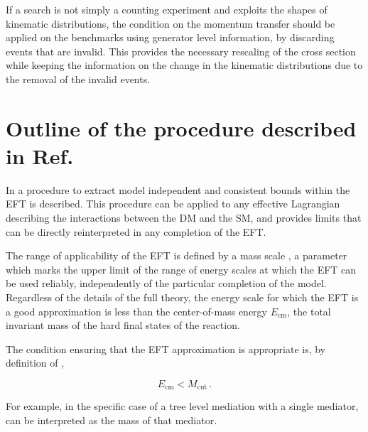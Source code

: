 If a search is not simply a counting experiment and exploits the shapes of kinematic distributions, the condition on the momentum transfer should be applied on the benchmarks using generator level information, by discarding events that are invalid. This provides the necessary rescaling of the cross section while keeping the information on the change in the kinematic distributions due to the removal of the invalid events. 

\clearpage

\section{\texorpdfstring{Outline of the procedure described in Ref.~\cite{Racco:2015dxa}}{Outline of the procedure described in Refs.}}
\label{sec:TruncationWithSHat}

In \cite{Racco:2015dxa} a procedure to extract model independent and consistent bounds within the EFT is described. This procedure can be applied to any effective Lagrangian describing the interactions between the DM and the SM, and provides limits that can be directly reinterpreted in any completion of the EFT.

The range of applicability of the EFT is defined by a mass scale \Mcut, a parameter which marks the upper limit of the range of energy scales at which the EFT can be used reliably, independently of the particular completion of the model. 
Regardless of the  details of the full theory, the energy scale for which the EFT is a good approximation is less than the center-of-mass energy $E_\text{cm}$, the total invariant mass of the hard final states of the reaction.%


The condition ensuring that the EFT approximation is appropriate is, by definition of \Mcut,

\begin{equation}
\label{Ecm<Mcut}
E_\text{cm}<M_\text{cut}\,.
\end{equation}

For example, in the specific case of a tree level mediation with a single mediator, \Mcut can be interpreted as the mass of that mediator.

